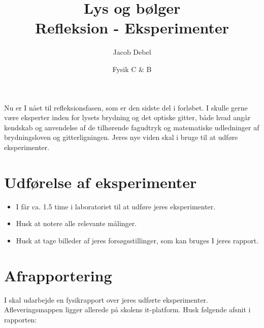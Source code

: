 \documentclass[a4paper, 12pt]{article}
\author{Jacob Debel}
\date{Fysik C \& B}
\title{Lys og bølger\\\medskip
\large Refleksion - Eksperimenter}
\begin{document}
\maketitle
Nu er I nået til refleksionsfasen, som er den sidste del i forløbet. I skulle gerne være eksperter inden for lysets brydning og det optiske gitter, både hvad angår kendskab og anvendelse af de tilhørende fagudtryk og matematiske udledninger af brydningsloven og gitterligningen. Jeres nye viden skal i bruge til at udføre eksperimenter.

\section*{Udførelse af eksperimenter}
\label{sec:org8605a7a}

\begin{itemize}
\item I får ca. 1.5 time i laboratoriet til at udføre jeres eksperimenter.

\item Husk at notere alle relevante målinger.

\item Husk at tage billeder af jeres forsøgsstillinger, som kan bruges I jeres rapport.
\end{itemize}

\newpage

\section*{Afrapportering}
\label{sec:org761334a}

I skal udarbejde en fysikrapport over jeres udførte eksperimenter. Afleveringsmappen ligger allerede på skolens it-platform. Husk følgende afsnit i rapporten:
\end{document}
